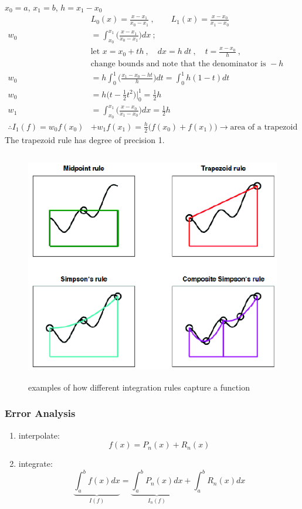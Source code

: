 \documentclass[12pt]{article}
\begin{document}
$x_0 = a$, $x_1 = b$, $h = x_1 - x_0$
%
\begin{align*}
&L_0(x) = \frac{x-x_1}{x_0-x_1}\:, \qquad L_1(x) = \frac{x-x_0}{x_1-x_0} \\
%
w_0 &= \int_{x_0}^{x_1} \bigl(\frac{x-x_1}{x_0-x_1}\bigr) dx\:; 
\\ &\text{let } x = x_0 + th  \:, \quad dx = h\:dt\:, \quad t = \frac{x-x_0}{h}\:,\\
&\text{change bounds and note that the denominator is }-h \\
%
w_0 &= h \int_0^1 \bigl(\frac{x_1 - x_0 - ht}{h}\bigr)dt = \int_0^1 h(1-t)dt \\
%
w_0 &= h\bigl(t - \frac{1}{2}t^2 \bigr) |_0^1 = \frac{1}{2}h\\
%
w_1 &= \int_{x_0}^{x_1} \bigl(\frac{x-x_0}{x_1-x_0}\bigr) dx = \frac{1}{2}h\\
%
\therefore I_1(f) = w_0f(x_0) &+ w_1f(x_1)  = \boxed{\frac{h}{2}\bigl(f(x_0) + f(x_1)\bigr)} \rightarrow \text{area of a trapezoid}
\end{align*}
%
The trapezoid rule has degree of precision 1.

\begin{figure}
\begin{center}
  \includegraphics[height=4in,clip]{QuadratureComparison}
\end{center}
\caption{examples of how different integration rules capture a function}
\end{figure}

\subsubsection*{Error Analysis}
\begin{enumerate}
\item interpolate:
\[f(x) = P_n(x) + R_n(x)\]
\item integrate:
\[\underbrace{\int_a^b f(x) dx}_{I(f)} = \underbrace{\int_a^b P_n(x)dx}_{I_n(f)} + \int_a^b R_n(x) dx\]
\end{enumerate}
\end{document}
